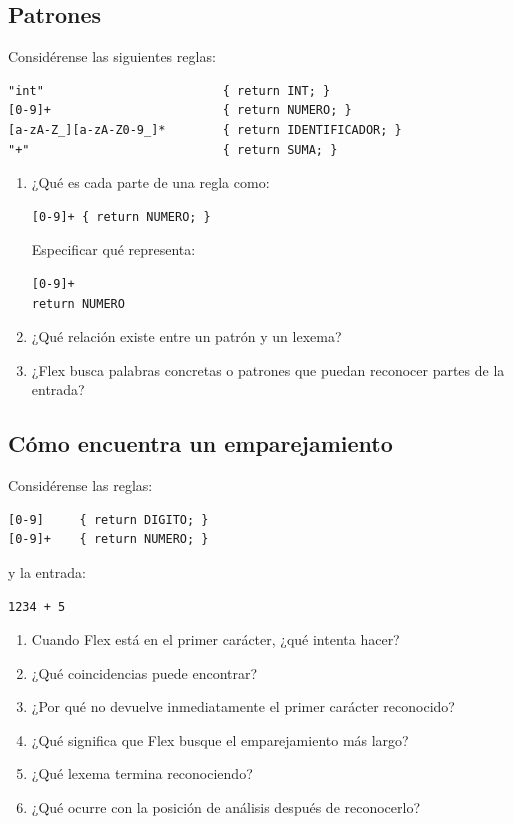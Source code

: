 \documentclass{article}
\begin{document}
\subsection{Patrones}

Considérense las siguientes reglas:

\begin{verbatim}
"int"                         { return INT; }
[0-9]+                        { return NUMERO; }
[a-zA-Z_][a-zA-Z0-9_]*        { return IDENTIFICADOR; }
"+"                           { return SUMA; }
\end{verbatim}

\begin{enumerate}
    \item ¿Qué es cada parte de una regla como:

\begin{verbatim}
[0-9]+ { return NUMERO; }
\end{verbatim}

    Especificar qué representa:

\begin{verbatim}
[0-9]+
return NUMERO
\end{verbatim}

    \item ¿Qué relación existe entre un patrón y un lexema?

    \item ¿Flex busca palabras concretas o patrones que puedan reconocer
    partes de la entrada?
\end{enumerate}

\subsection{Cómo encuentra un emparejamiento}

Considérense las reglas:

\begin{verbatim}
[0-9]     { return DIGITO; }
[0-9]+    { return NUMERO; }
\end{verbatim}

y la entrada:

\begin{verbatim}
1234 + 5
\end{verbatim}

\begin{enumerate}
    \item Cuando Flex está en el primer carácter, ¿qué intenta hacer?

    \item ¿Qué coincidencias puede encontrar?

    \item ¿Por qué no devuelve inmediatamente el primer carácter
    reconocido?

    \item ¿Qué significa que Flex busque el emparejamiento más largo?

    \item ¿Qué lexema termina reconociendo?

    \item ¿Qué ocurre con la posición de análisis después de reconocerlo?
\end{enumerate}
\end{document}
